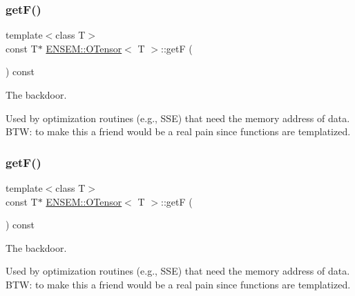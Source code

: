 \mbox{\label{classENSEM_1_1OTensor_ac9462508146fa6ceba2797c9994ea54c}} 
\subsubsection{\texorpdfstring{getF()}{getF()}\hspace{0.1cm}{\footnotesize\ttfamily [1/6]}}
{\footnotesize\ttfamily template$<$class T$>$ \\
const T$\ast$ \mbox{\hyperlink{classENSEM_1_1OTensor}{E\+N\+S\+E\+M\+::\+O\+Tensor}}$<$ T $>$\+::getF (\begin{DoxyParamCaption}{ }\end{DoxyParamCaption}) const\hspace{0.3cm}{\ttfamily [inline]}}



The backdoor. 

Used by optimization routines (e.\+g., S\+SE) that need the memory address of data. B\+TW\+: to make this a friend would be a real pain since functions are templatized. \mbox{\label{classENSEM_1_1OTensor_ac9462508146fa6ceba2797c9994ea54c}} 
\subsubsection{\texorpdfstring{getF()}{getF()}\hspace{0.1cm}{\footnotesize\ttfamily [2/6]}}
{\footnotesize\ttfamily template$<$class T$>$ \\
const T$\ast$ \mbox{\hyperlink{classENSEM_1_1OTensor}{E\+N\+S\+E\+M\+::\+O\+Tensor}}$<$ T $>$\+::getF (\begin{DoxyParamCaption}{ }\end{DoxyParamCaption}) const\hspace{0.3cm}{\ttfamily [inline]}}



The backdoor. 

Used by optimization routines (e.\+g., S\+SE) that need the memory address of data. B\+TW\+: to make this a friend would be a real pain since functions are templatized. \mbox{\label{classENSEM_1_1OTensor_ac9462508146fa6ceba2797c9994ea54c}} 
